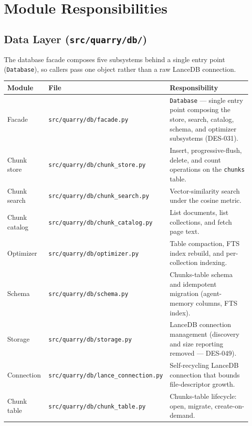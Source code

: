 \documentclass[a4paper,10pt]{article}
\newcommand{\modpath}[1]{\texttt{src/quarry/#1}}
\begin{document}
\section{Module Responsibilities}

\subsection{Data Layer (\modpath{db/})}

The database facade composes five subsystems behind a single entry
point (\texttt{Database}), so callers pass one object rather than a raw
LanceDB connection.

\begin{center}
\begin{tabular}{llp{7cm}}
\toprule
\textbf{Module} & \textbf{File} & \textbf{Responsibility} \\
\midrule
Facade        & \modpath{db/facade.py}        & \texttt{Database} ---
                single entry point composing the store, search, catalog,
                schema, and optimizer subsystems (DES-031). \\
Chunk store   & \modpath{db/chunk\_store.py}   & Insert,
                progressive-flush, delete, and count operations on the
                \texttt{chunks} table. \\
Chunk search  & \modpath{db/chunk\_search.py}  & Vector-similarity
                search under the cosine metric. \\
Chunk catalog & \modpath{db/chunk\_catalog.py} & List documents, list
                collections, and fetch page text. \\
Optimizer     & \modpath{db/optimizer.py}      & Table compaction, FTS
                index rebuild, and per-collection indexing. \\
Schema        & \modpath{db/schema.py}         & Chunks-table schema and
                idempotent migration (agent-memory columns, FTS index). \\
Storage       & \modpath{db/storage.py}        & LanceDB connection
                management (discovery and size reporting removed --- DES-049). \\
Connection    & \modpath{db/lance_connection.py}     & Self-recycling LanceDB
                connection that bounds file-descriptor growth. \\
Chunk table   & \modpath{db/chunk\_table.py}   & Chunks-table lifecycle:
                open, migrate, create-on-demand. \\
\bottomrule
\end{tabular}
\end{center}
\end{document}
